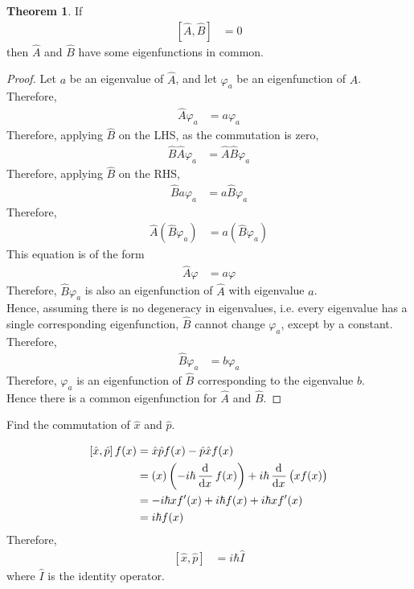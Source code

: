\documentclass[titlepage, fleqn, a4paper, 12pt, twoside]{article}
\theoremstyle{definition}
\theoremstyle{theorem}
\newtheorem{theorem}{Theorem}
\begin{document}
\begin{theorem}
	If
	\begin{align*}
		\left[ \hat{A} , \hat{B} \right] &= 0
	\end{align*}
	then $\hat{A}$ and $\hat{B}$ have some eigenfunctions in common.
\end{theorem}

\begin{proof}
	Let $a$ be an eigenvalue of $\hat{A}$, and let $\varphi_a$ be an eigenfunction of $\hat{A}$.\\
	Therefore,
	\begin{align*}
		\hat{A} \varphi_a &= a \varphi_a
	\end{align*}
	Therefore, applying $\hat{B}$ on the LHS, as the commutation is zero,
	\begin{align*}
		\hat{B} \hat{A} \varphi_a &= \hat{A} \hat{B} \varphi_a
	\end{align*}
	Therefore, applying $\hat{B}$ on the RHS,
	\begin{align*}
		\hat{B} a \varphi_a &= a \hat{B} \varphi_a
	\end{align*}
	Therefore,
	\begin{align*}
		\hat{A} \left( \hat{B} \varphi_a \right) &= a \left( \hat{B} \varphi_a \right)
	\end{align*}
	This equation is of the form
	\begin{align*}
		\hat{A} \varphi &= a \varphi
	\end{align*}
	Therefore, $\hat{B} \varphi_a$ is also an eigenfunction of $\hat{A}$ with eigenvalue $a$.\\
	Hence, assuming there is no degeneracy in eigenvalues, i.e. every eigenvalue has a single corresponding eigenfunction, $\hat{B}$ cannot change $\varphi_a$, except by a constant.\\
	Therefore,
	\begin{align*}
		\hat{B} \varphi_a &= b \varphi_a
	\end{align*}
	Therefore, $\varphi_a$ is an eigenfunction of $\hat{B}$ corresponding to the eigenvalue $b$.\\
	Hence there is a common eigenfunction for $\hat{A}$ and $\hat{B}$.
\end{proof}

\begin{question}
	Find the commutation of $\hat{x}$ and $\hat{p}$.
\end{question}

\begin{solution}
	\begin{align*}
		\left[ \hat{x} , \hat{p} \right]f(x) &= \hat{x} \hat{p} f(x) - \hat{p} \hat{x} f(x)\\
		&= (x) \left( -i \hbar \dod{}{x} f(x) \right) + i \hbar \dod{}{x}\left( x f(x) \right)\\
		&= -i \hbar x f'(x) + i \hbar f(x) + i \hbar x f'(x)\\
		&= i \hbar f(x)
	\end{align*}
	Therefore,
	\begin{align*}
		\left[ \hat{x} , \hat{p} \right] &= i \hbar \hat{I}
	\end{align*}
	where $\hat{I}$ is the identity operator.
\end{solution}
\end{document}
